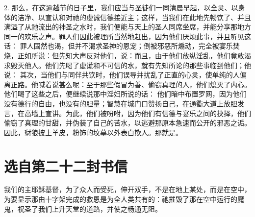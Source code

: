 2. 那么，在这逾越节的日子里，我们应当与圣徒们一同清晨早起，以全灵、以身体的洁净、以宣认和对祂的虔诚信德接近主；这样，当我们在此地先畅饮了、并且满溢了从祂流出的神圣之水时，我们便能与天上的圣人同席坐席，并能分享那地方同一的欢乐之声。罪人们因此被理所当然地赶出，因为他们厌烦此事，并且听见这话： 罪人固然也渴，但并不渴求圣神的恩宠；倒被邪恶所煽动，完全被宴乐焚烧，正如所说：但先知大声反对他们，说：而且，由于他们放纵淫乱，他们竟敢渴求毁灭他人。他们先喝了虚谎和不可信的水，就有先知所论的那些事临到他们；他说： 其次，当他们与同伴共饮时，他们误导并扰乱了正直的心灵，使单纯的人偏离正路。他喊着说甚么呢：至于那些假冒为善、偷窃真理的人，他们熄灭了内心。他们喝了这些之后，便继续说那中淫妇所说的话： 他们暗中布置罗网，因为他们没有德行的自由，也没有的胆量；智慧在城门口赞扬自己，在通衢大道上放胆发言，在高墙上宣讲。为此，他们被吩咐，因为他们有信德与宴乐之间的抉择，他们偷窃了真理的甘甜，并伪装了自己的苦水，以逃避那原本急速而公开的邪恶之诟。因此，豺狼披上羊皮，粉饰的坟墓以外表白欺人。那就是。\par



\section{选自第二十二封书信}

\par

我们的主耶稣基督，为了众人而受死，伸开双手，不是在地上某处，而是在空中，为要显示那由十字架完成的救恩是为全人类共有的：祂摧毁了那在空中运行的魔鬼，祝圣了我们上升天堂的道路，并使之畅通无阻。\par

